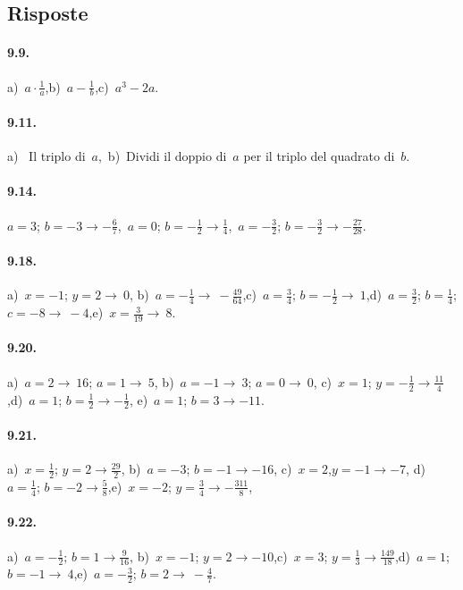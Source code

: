\subsection{Risposte}
\begin{multicols}{2}
\paragraph{9.9.}
a)~$a \cdot\frac{1}{a}$,\quad b)~$a-\frac{1}{b}$,\quad c)~$a^3-2a$.
\paragraph{9.11.}
a)~ Il triplo di~$a$,\quad ~b)~Dividi il doppio di~$a$ per il triplo del quadrato di~$b$.
\paragraph{9.14.} $a=3$; $b=-3\rightarrow -\frac{6}{7}$,\quad~$a=0$; $b=-\frac{1}{2}\rightarrow \frac{1}{4}$,\quad~$a=-\frac{3}{2}$; $b=-\frac{3}{2}\rightarrow -\frac{27}{28}$.
\paragraph{9.18.}
a)~$x=-1$; $y=2 \rightarrow~0$,
b)~$a=-\frac{1}{4} \rightarrow~-\frac{49}{64}$,\quad c)~$a=\frac{3}{4}$; $b=-\frac{1}{2} \rightarrow~1$,\quad d)~$a=\frac{3}{2}$; $b=\frac{1}{4}$; $c=-8 \rightarrow~-4$,\quad e)~$x=\frac{3}{19} \rightarrow~8$.
\paragraph{9.20.}
a)~$a=2 \rightarrow~16$; $a=1 \rightarrow~5$, \quad b)~$a=-1 \rightarrow~3$; $a=0 \rightarrow~0$,
c)~$x=1$; $y=-\frac{1}{2} \rightarrow \frac{11}{4}$,\quad d)~$a=1$; $b=\frac{1}{2}\rightarrow -\frac{1}{2}$, \quad e)~$a=1$; $b=3 \rightarrow -11$.
\paragraph{9.21.}
a)~$x=\frac{1}{2}$; $y=2 \rightarrow \frac{29}{2}$, \quad b)~$a=-3$; $b=-1 \rightarrow -16$, \quad c)~$x=2$,$y=-1 \rightarrow -7$,
d)~$a=\frac{1}{4}$; $b=-2 \rightarrow \frac{5}{8}$,\quad e)~$x=-2$; $y=\frac{3}{4} \rightarrow -\frac{311}8{}$,\quad
\paragraph{9.22.}
a)~$a=-\frac{1}{2}$; $b=1 \rightarrow \frac{9}{16}$,
b)~$x=-1$; $y=2 \rightarrow -10$,\quad c)~$x=3$; $y=\frac{1}{3} \rightarrow \frac{149}{18}$,\quad d)~$a=1$; $b=-1 \rightarrow~4$,\quad e)~$a=-\frac{3}{2}$; $b=2 \rightarrow~-\frac{4}{7}$.

\end{multicols}
